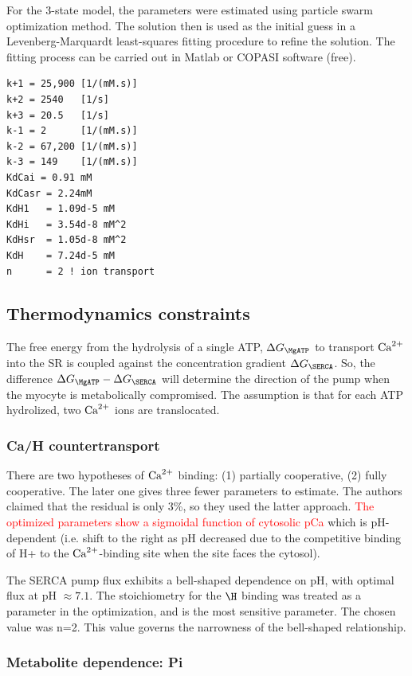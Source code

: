 For the 3-state model, the parameters were estimated using particle
swarm optimization method. The solution then is used as the initial
guess in a Levenberg-Marquardt least-squares fitting procedure to
refine the solution. The fitting process can be carried out in Matlab
or COPASI software (free). 

\begin{verbatim}
k+1 = 25,900 [1/(mM.s)]
k+2 = 2540   [1/s]
k+3 = 20.5   [1/s]
k-1 = 2      [1/(mM.s)]
k-2 = 67,200 [1/(mM.s)]
k-3 = 149    [1/(mM.s)]
KdCai = 0.91 mM
KdCasr = 2.24mM
KdH1   = 1.09d-5 mM
KdHi   = 3.54d-8 mM^2
KdHsr  = 1.05d-8 mM^2
KdH    = 7.24d-5 mM
n      = 2 ! ion transport
\end{verbatim}


\subsection{Thermodynamics constraints}
\label{sec:therm-constr}

The free energy from the hydrolysis of a single ATP, $\Delta G_\MgATP$ to
transport ${\text{Ca}^{2+}}$ into the SR is coupled against the concentration gradient
$\Delta G_\SERCA$. So, the difference $\Delta G_\MgATP-\Delta G_\SERCA$ will
determine the direction of the pump when the myocyte is metabolically
compromised. The assumption is that for each ATP hydrolized, two ${\text{Ca}^{2+}}$ ions are
translocated.

\subsubsection{Ca/H countertransport}

There are two hypotheses of ${\text{Ca}^{2+}}$ binding: (1) partially cooperative, (2) fully
cooperative. The later one gives three fewer parameters to estimate. The authors
claimed that the residual is only 3\%, so they used the latter approach.
\textcolor{red}{The optimized parameters show a sigmoidal function of cytosolic
pCa} which is pH-dependent (i.e. shift to the right as pH decreased due to the
competitive binding of H+ to the ${\text{Ca}^{2+}}$-binding site when the site faces the
cytosol).

The SERCA pump flux exhibits a bell-shaped dependence on pH, with optimal flux
at pH $\approx 7.1$. The stoichiometry for the $\H$ binding was treated as a
parameter in the optimization, and is the most sensitive parameter. The chosen
value was n=2. This value governs the narrowness of the bell-shaped
relationship. 

\subsubsection{Metabolite dependence: Pi}

